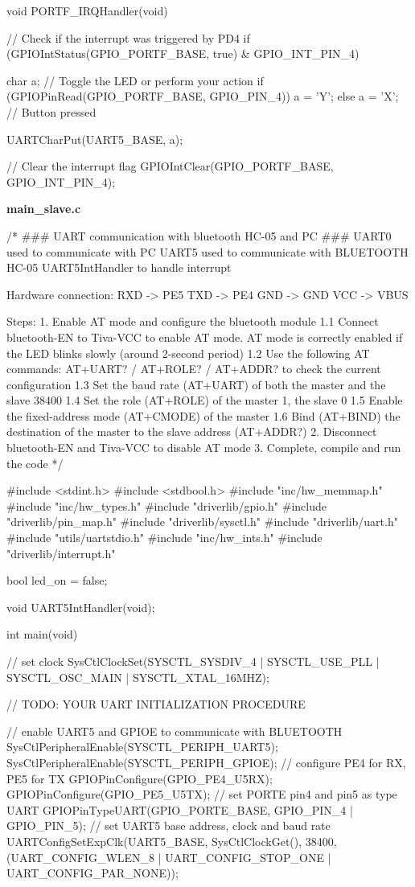 \documentclass[12pt, a4paper]{article}
\begin{document}
\begin{code}
void PORTF_IRQHandler(void)
{
    // Check if the interrupt was triggered by PD4
    if (GPIOIntStatus(GPIO_PORTF_BASE, true) & GPIO_INT_PIN_4)
    {
        char a;
        // Toggle the LED or perform your action
        if (GPIOPinRead(GPIO_PORTF_BASE, GPIO_PIN_4))
            a = 'Y';
        else
            a = 'X'; // Button pressed

        UARTCharPut(UART5_BASE, a);
    }
    // Clear the interrupt flag
    GPIOIntClear(GPIO_PORTF_BASE, GPIO_INT_PIN_4);
}
\end{code}
\text{   }
\linebreak
\textbf{main\_slave.c}
\begin{code}
/*
### UART communication with bluetooth HC-05 and PC ###
UART0 used to communicate with PC
UART5 used to communicate with BLUETOOTH HC-05
UART5IntHandler to handle interrupt

Hardware connection:
RXD -> PE5
TXD -> PE4
GND -> GND
VCC -> VBUS

Steps:
1. Enable AT mode and configure the bluetooth module
    1.1 Connect bluetooth-EN to Tiva-VCC to enable AT mode. AT mode is correctly enabled if the LED blinks slowly (around 2-second period)
    1.2 Use the following AT commands: AT+UART? / AT+ROLE? / AT+ADDR? to check the current configuration
    1.3 Set the baud rate (AT+UART) of both the master and the slave 38400
    1.4 Set the role (AT+ROLE) of the master 1, the slave 0
    1.5 Enable the fixed-address mode (AT+CMODE) of the master
    1.6 Bind (AT+BIND) the destination of the master to the slave address (AT+ADDR?)
2. Disconnect bluetooth-EN and Tiva-VCC to disable AT mode
3. Complete, compile and run the code
*/

#include <stdint.h>
#include <stdbool.h>
#include "inc/hw_memmap.h"
#include "inc/hw_types.h"
#include "driverlib/gpio.h"
#include "driverlib/pin_map.h"
#include "driverlib/sysctl.h"
#include "driverlib/uart.h"
#include "utils/uartstdio.h"
#include "inc/hw_ints.h"
#include "driverlib/interrupt.h"

bool led_on = false;

void UART5IntHandler(void);

int main(void) {
    // set clock
    SysCtlClockSet(SYSCTL_SYSDIV_4 | SYSCTL_USE_PLL | SYSCTL_OSC_MAIN | SYSCTL_XTAL_16MHZ);

    // TODO: YOUR UART INITIALIZATION PROCEDURE


    // enable UART5 and GPIOE to communicate with BLUETOOTH
    SysCtlPeripheralEnable(SYSCTL_PERIPH_UART5);
    SysCtlPeripheralEnable(SYSCTL_PERIPH_GPIOE);
    // configure PE4 for RX, PE5 for TX
    GPIOPinConfigure(GPIO_PE4_U5RX);
    GPIOPinConfigure(GPIO_PE5_U5TX);
    // set PORTE pin4 and pin5 as type UART
    GPIOPinTypeUART(GPIO_PORTE_BASE, GPIO_PIN_4 | GPIO_PIN_5);
    // set UART5 base address, clock and baud rate
    UARTConfigSetExpClk(UART5_BASE, SysCtlClockGet(), 38400,
    (UART_CONFIG_WLEN_8 | UART_CONFIG_STOP_ONE | UART_CONFIG_PAR_NONE));

}
\end{code}
\end{document}
